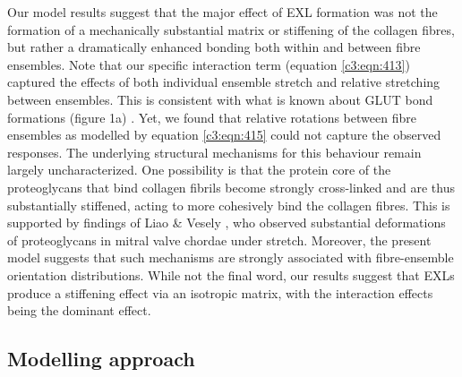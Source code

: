     
    Our model results suggest that the major effect of EXL formation was not the formation of a mechanically substantial matrix or stiffening of the collagen fibres, but rather a dramatically enhanced bonding both within and between fibre ensembles. Note that our specific interaction term (equation \ref{c3:eqn:413}) captured the effects of both individual ensemble stretch and relative stretching between ensembles. This is consistent with what is known about GLUT bond formations (figure 1a) \cite{nimni_chemically_1987}\cite{cheung_mechanism_1985}\cite{cheung_presence_1983}\cite{cheung_mechanism_1982}\cite{cheung_mechanism_1982II}. Yet, we found that relative rotations between fibre ensembles as modelled by equation \ref{c3:eqn:415} could not capture the observed responses. The underlying structural mechanisms for this behaviour remain largely uncharacterized. One possibility is that the protein core of the proteoglycans that bind collagen fibrils become strongly cross-linked and are thus substantially stiffened, acting to more cohesively bind the collagen fibres. This is supported by findings of Liao \& Vesely \cite{liao_relationship_2004}, who observed substantial deformations of proteoglycans in mitral valve chordae under stretch. Moreover, the present model suggests that such mechanisms are strongly associated with fibre-ensemble orientation distributions. While not the final word, our results suggest that EXLs produce a stiffening effect via an isotropic matrix, with the interaction effects being the dominant effect.
    
    


\subsection{Modelling approach}

